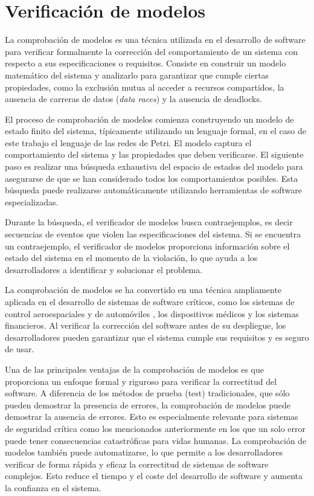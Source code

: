 \section{Verificación de modelos}

La comprobación de modelos es una técnica utilizada en el desarrollo de software para verificar
formalmente la corrección del comportamiento de un sistema con respecto a sus
especificaciones o requisitos. Consiste en construir un modelo matemático del sistema y
analizarlo para garantizar que cumple ciertas propiedades, como la exclusión mutua al acceder
a recursos compartidos, la ausencia de carreras de datos (\textit{data races}) y la ausencia de deadlocks.

El proceso de comprobación de modelos comienza construyendo un modelo de estado finito
del sistema, típicamente utilizando un lenguaje formal, en el caso de este trabajo el lenguaje de
las redes de Petri. El modelo captura el comportamiento del sistema y las propiedades que
deben verificarse. El siguiente paso es realizar una búsqueda exhaustiva del espacio de estados
del modelo para asegurarse de que se han considerado todos los comportamientos posibles.
Esta búsqueda puede realizarse automáticamente utilizando herramientas de software
especializadas.

Durante la búsqueda, el verificador de modelos busca contraejemplos, es decir secuencias de
eventos que violen las especificaciones del sistema. Si se encuentra un contraejemplo, el
verificador de modelos proporciona información sobre el estado del sistema en el momento de
la violación, lo que ayuda a los desarrolladores a identificar y solucionar el problema.

La comprobación de modelos se ha convertido en una técnica ampliamente aplicada en el
desarrollo de sistemas de software críticos, como los sistemas de control aeroespaciales
\cite{carreno2005safety,monzon2009deadlock} y de automóviles \cite{Perronnet2019},
los dispositivos médicos y los sistemas financieros. Al verificar la corrección del
software antes de su despliegue, los desarrolladores pueden garantizar que el sistema cumple
sus requisitos y es seguro de usar.

Una de las principales ventajas de la comprobación de modelos es que proporciona un enfoque
formal y riguroso para verificar la correctitud del software. A diferencia de los métodos de
prueba (test) tradicionales, que sólo pueden demostrar la presencia de errores, la comprobación de
modelos puede demostrar la ausencia de errores. Esto es especialmente relevante para sistemas
de seguridad crítica como los mencionados anteriormente en los que un solo error puede tener
consecuencias catastróficas para vidas humanas. La comprobación de modelos también puede
automatizarse, lo que permite a los desarrolladores verificar de forma rápida y eficaz la
correctitud de sistemas de software complejos. Esto reduce el tiempo y el coste del desarrollo de
software y aumenta la confianza en el sistema.


